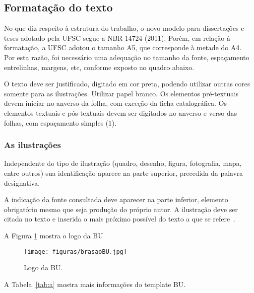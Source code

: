 \documentclass{ufscThesis} %
\begin{document}
\subsection{Formatação do texto}

No que diz respeito à estrutura do trabalho, o novo modelo para dissertações e teses adotado pela UFSC segue a NBR 14724 (2011). Porém, em relação à formatação, a UFSC adotou o tamanho A5, que corresponde à metade do A4. Por esta razão, foi necessário uma adequação no tamanho da fonte, espaçamento entrelinhas, margens, etc, conforme exposto no quadro abaixo.

O texto deve ser justificado, digitado em cor preta, podendo utilizar outras cores somente para as ilustrações. Utilizar papel branco. Os elementos pré-textuais devem iniciar no anverso da folha, com  exceção da ficha catalográfica. Os elementos textuais e pós-textuais devem ser digitados no anverso e verso das folhas, com espaçamento simples (1).



\subsubsection{As ilustrações}

Independente do tipo de ilustração (quadro, desenho, figura, fotografia, mapa, entre outros) sua identificação aparece na parte superior, precedida da palavra designativa.



A indicação da fonte consultada deve aparecer na parte inferior, elemento obrigatório mesmo que seja produção do próprio autor. A ilustração deve ser citada no texto e inserida o mais próximo possível do texto a que se refere~\cite{abnt14724}.

A Figura \ref{fig:a} mostra o logo da BU
\begin{figure}[!htb]
   \centering
   \caption{Logo da BU.}\label{fig:a}
   \texttt{[image: figuras/brasaoBU.jpg]}
\end{figure}

A Tabela~\ref{tab:a} mostra mais informações do template BU.
\end{document}
